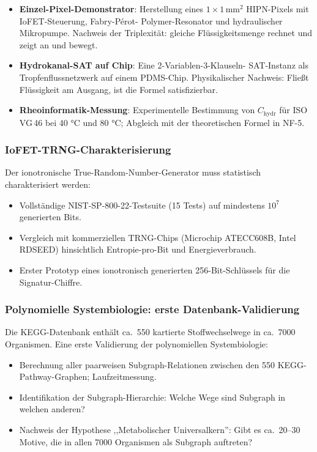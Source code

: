 ﻿\documentclass[a4paper,12pt]{scrreprt}
\theoremstyle{definition}
\begin{document}
\begin{itemize}
  \item \textbf{Einzel-Pixel-Demonstrator}: Herstellung eines
    $1 \times 1$\,mm$^2$ HIPN-Pixels mit IoFET-Steuerung, Fabry-Pérot-
    Polymer-Resonator und hydraulischer Mikropumpe. Nachweis der
    Triplexität: gleiche Flüssigkeitsmenge rechnet und zeigt an und bewegt.
  \item \textbf{Hydrokanal-SAT auf Chip}: Eine 2-Variablen-3-Klauseln-
    SAT-Instanz als Tropfenflussnetzwerk auf einem PDMS-Chip.  
    Physikalischer Nachweis: Fließt Flüssigkeit am Ausgang, ist die Formel
    satisfizierbar.
  \item \textbf{Rheoinformatik-Messung}: Experimentelle Bestimmung von
    $C_\mathrm{hydr}$ für ISO\,VG\,46 bei 40 °C und 80 °C; Abgleich
    mit der theoretischen Formel in NF-5.
\end{itemize}

\subsubsection{IoFET-TRNG-Charakterisierung}

Der ionotronische True-Random-Number-Generator muss statistisch
charakterisiert werden:
\begin{itemize}
  \item Vollständige NIST-SP-800-22-Testsuite (15 Tests) auf
    mindestens $10^7$ generierten Bits.
  \item Vergleich mit kommerziellen TRNG-Chips (Microchip ATECC608B,
    Intel RDSEED) hinsichtlich Entropie-pro-Bit und Energieverbrauch.
  \item Erster Prototyp eines ionotronisch generierten 256-Bit-Schlüssels
    für die Signatur-Chiffre.
\end{itemize}

\subsubsection{Polynomielle Systembiologie: erste Datenbank-Validierung}

Die KEGG-Datenbank enthält ca.\ 550 kartierte Stoffwechselwege in ca.\
7000 Organismen. Eine erste Validierung der polynomiellen Systembiologie:
\begin{itemize}
  \item Berechnung aller paarweisen Subgraph-Relationen zwischen den
    550 KEGG-Pathway-Graphen; Laufzeitmessung.
  \item Identifikation der Subgraph-Hierarchie: Welche Wege sind Subgraph
    in welchen anderen?
  \item Nachweis der Hypothese ,,Metabolischer Universalkern'': Gibt es
    ca.\ 20--30 Motive, die in allen 7000 Organismen als Subgraph auftreten?
\end{itemize}
\end{document}
